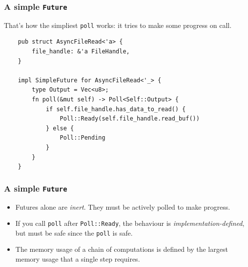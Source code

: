 \documentclass[aspectratio=1610,t]{beamer}
\begin{document}

\begin{frame}[fragile]
\frametitle{A simple \texttt{Future}}
That's how the simpliest \texttt{poll} works: it tries to make some progress on call.

\begin{verbatim}
    pub struct AsyncFileRead<'a> {
        file_handle: &'a FileHandle,
    }

    impl SimpleFuture for AsyncFileRead<'_> {
        type Output = Vec<u8>;
        fn poll(&mut self) -> Poll<Self::Output> {
            if self.file_handle.has_data_to_read() {
                Poll::Ready(self.file_handle.read_buf())
            } else {
                Poll::Pending
            }
        }
    }
\end{verbatim}
\end{frame}


\begin{frame}[fragile]
\frametitle{A simple \texttt{Future}}
\begin{itemize}
    \item Futures alone are \textit{inert}. They must be actively polled to make progress.
    \item If you call \texttt{poll} after \texttt{Poll::Ready}, the behaviour is \textit{implementation-defined}, but must be safe since the \texttt{poll} is safe.
    \item The memory usage of a chain of computations is defined by the largest memory usage that a single step requires.
\end{itemize}

\end{frame}

\end{document}
